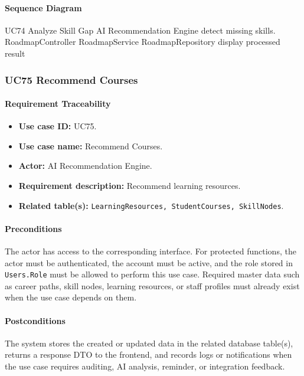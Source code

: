 \paragraph{Sequence Diagram}

\SequenceDiagram
{UC74 Analyze Skill Gap}
{AI Recommendation Engine}
{detect missing skills.}
{RoadmapController}
{RoadmapService}
{RoadmapRepository}
{display processed result}

\subsubsection{UC75 Recommend Courses}

\paragraph{Requirement Traceability}

\begin{itemize}
    \item \textbf{Use case ID:} UC75.
    \item \textbf{Use case name:} Recommend Courses.
    \item \textbf{Actor:} AI Recommendation Engine.
    \item \textbf{Requirement description:} Recommend learning resources.
    \item \textbf{Related table(s):} \texttt{LearningResources, StudentCourses, SkillNodes}.
\end{itemize}

\paragraph{Preconditions}

The actor has access to the corresponding interface. For protected functions, the actor must be authenticated, the account must be active, and the role stored in \texttt{Users.Role} must be allowed to perform this use case. Required master data such as career paths, skill nodes, learning resources, or staff profiles must already exist when the use case depends on them.

\paragraph{Postconditions}

The system stores the created or updated data in the related database table(s), returns a response DTO to the frontend, and records logs or notifications when the use case requires auditing, AI analysis, reminder, or integration feedback.


